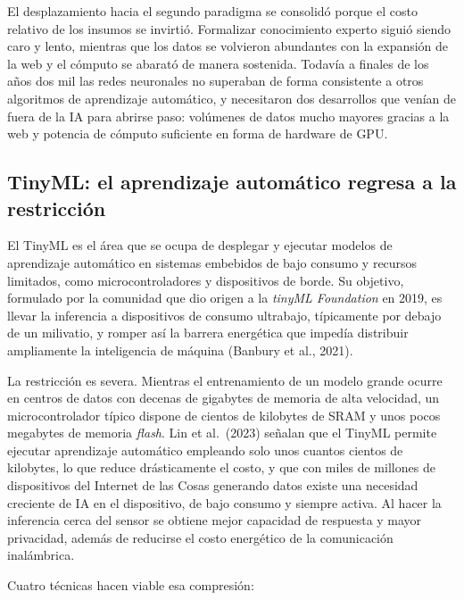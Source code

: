 \documentclass[12pt,letterpaper,oneside]{article}
\begin{document}
El desplazamiento hacia el segundo paradigma se consolidó porque el costo relativo de los insumos se invirtió. Formalizar conocimiento experto siguió siendo caro y lento, mientras que los datos se volvieron abundantes con la expansión de la web y el cómputo se abarató de manera sostenida. Todavía a finales de los años dos mil las redes neuronales no superaban de forma consistente a otros algoritmos de aprendizaje automático, y necesitaron dos desarrollos que venían de fuera de la IA para abrirse paso: volúmenes de datos mucho mayores gracias a la web y potencia de cómputo suficiente en forma de hardware de GPU.

\subsection{TinyML: el aprendizaje automático regresa a la restricción}

El TinyML es el área que se ocupa de desplegar y ejecutar modelos de aprendizaje automático en sistemas embebidos de bajo consumo y recursos limitados, como microcontroladores y dispositivos de borde. Su objetivo, formulado por la comunidad que dio origen a la \textit{tinyML Foundation} en 2019, es llevar la inferencia a dispositivos de consumo ultrabajo, típicamente por debajo de un milivatio, y romper así la barrera energética que impedía distribuir ampliamente la inteligencia de máquina (Banbury et al., 2021).

La restricción es severa. Mientras el entrenamiento de un modelo grande ocurre en centros de datos con decenas de gigabytes de memoria de alta velocidad, un microcontrolador típico dispone de cientos de kilobytes de SRAM y unos pocos megabytes de memoria \textit{flash}. Lin et al.\ (2023) señalan que el TinyML permite ejecutar aprendizaje automático empleando solo unos cuantos cientos de kilobytes, lo que reduce drásticamente el costo, y que con miles de millones de dispositivos del Internet de las Cosas generando datos existe una necesidad creciente de IA en el dispositivo, de bajo consumo y siempre activa. Al hacer la inferencia cerca del sensor se obtiene mejor capacidad de respuesta y mayor privacidad, además de reducirse el costo energético de la comunicación inalámbrica.

Cuatro técnicas hacen viable esa compresión:
\end{document}
